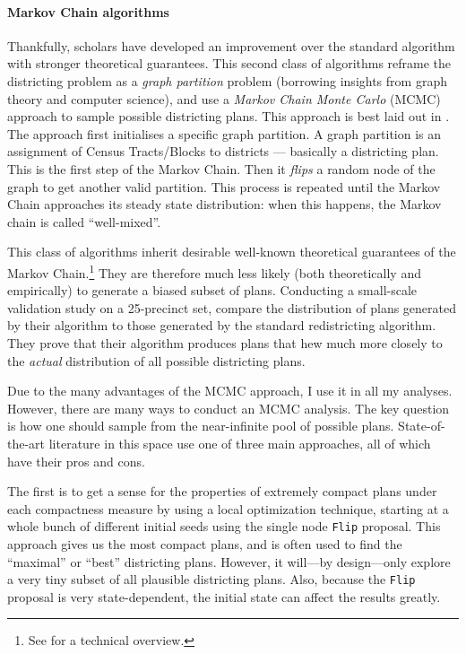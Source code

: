 \documentclass[]{article}
\let\oldparagraph\paragraph
\renewcommand{\paragraph}[1]{\oldparagraph{#1}\mbox{}}
\begin{document}
\hypertarget{markov-chain-algorithms}{%
\paragraph{Markov Chain algorithms}\label{markov-chain-algorithms}}

Thankfully, scholars have developed an improvement over the standard
algorithm with stronger theoretical guarantees. This second class of
algorithms reframe the districting problem as a \emph{graph partition}
problem (borrowing insights from graph theory and computer science), and
use a \emph{Markov Chain Monte Carlo} (MCMC) approach to sample possible
districting plans. This approach is best laid out in \cite{fifieldwp}.
The approach first initialises a specific graph partition. A graph
partition is an assignment of Census Tracts/Blocks to districts ---
basically a districting plan. This is the first step of the Markov
Chain. Then it \emph{flips} a random node of the graph to get another
valid partition. This process is repeated until the Markov Chain
approaches its steady state distribution: when this happens, the Markov
chain is called ``well-mixed''.

This class of algorithms inherit desirable well-known theoretical
guarantees of the Markov Chain.\footnote{See \cite{ddj2019recom} for a
  technical overview.} They are therefore much less likely (both
theoretically and empirically) to generate a biased subset of plans.
Conducting a small-scale validation study on a 25-precinct set,
\citeauthor{fifieldwp} compare the distribution of plans generated by
their algorithm to those generated by the standard redistricting
algorithm. They prove that their algorithm produces plans that hew much
more closely to the \emph{actual} distribution of all possible
districting plans.

Due to the many advantages of the MCMC approach, I use it in all my
analyses. However, there are many ways to conduct an MCMC analysis. The
key question is how one should sample from the near-infinite pool of
possible plans. State-of-the-art literature in this space use one of
three main approaches, all of which have their pros and cons.

The first is to get a sense for the properties of extremely compact
plans under each compactness measure by using a local optimization
technique, starting at a whole bunch of different initial seeds using
the single node \texttt{Flip} proposal. This approach gives us the most
compact plans, and is often used to find the ``maximal'' or ``best''
districting plans. However, it will---by design---only explore a very
tiny subset of all plausible districting plans. Also, because the
\texttt{Flip} proposal is very state-dependent, the initial state can
affect the results greatly.
\end{document}
